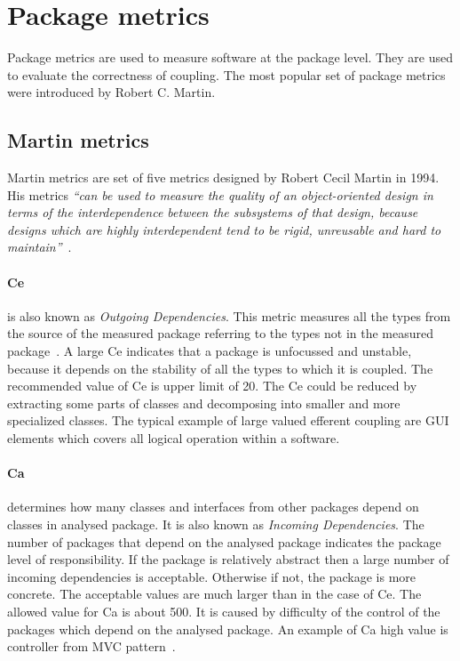 \section{Package metrics}

Package metrics are used to measure software at the package level. They are used to evaluate the correctness of coupling. The most popular set of package metrics were introduced by Robert C. Martin.

\subsection{Martin metrics}
Martin metrics are set of five metrics designed by Robert Cecil Martin in 1994. His metrics \textit{``can be used to measure the quality of an object-oriented design in terms of the interdependence between the subsystems of that design, because designs which are highly interdependent tend to be rigid, unreusable and hard to maintain''}~\cite{martin}.

\paragraph{\ac{Ce}} is also known as \textit{Outgoing Dependencies}. This metric measures all the types from the source of the measured package referring to the types not in the measured package~\cite{martin}. A large \ac{Ce} indicates that a package is unfocussed and unstable, because it depends on the stability of all the types to which it is coupled. The recommended value of \ac{Ce} is upper limit of 20. The \ac{Ce} could be reduced by extracting some parts of classes and decomposing into smaller and more specialized classes. The typical example of large valued efferent coupling are GUI elements which covers all logical operation within a software.

\paragraph{\ac{Ca}} determines how many classes and interfaces from other packages depend on classes in analysed package. It is also known as \textit{Incoming Dependencies}. The number of packages that depend on the analysed package indicates the package level of responsibility. If the package is relatively abstract then a large number of incoming dependencies is acceptable. Otherwise if not, the package is more concrete. The acceptable values are much larger than in the case of \ac{Ce}. The allowed value for \ac{Ca} is about 500. It is caused by difficulty of the control of the packages which depend on the analysed package. An example of \ac{Ca} high value is controller from MVC pattern~\cite{martin}.

